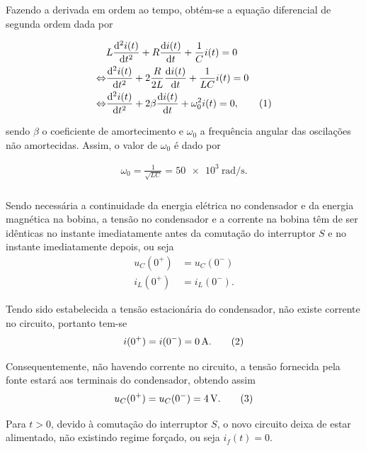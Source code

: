 \documentclass[a4paper, titlepage, portuguese]{article}
\newcommand{\eq}{\Leftrightarrow} %
\newcommand\numberthis{\addtocounter{equation}{1}\tag{\theequation}}
\begin{document}
		Fazendo a derivada em ordem ao tempo, obtém-se a equação diferencial de segunda ordem dada por

		\begin{align*}
			&L \dv[2]{i(t)}{t} + R\dv{i(t)}{t} + \frac{1}{C}i(t) = 0 \\ \eq
			&\dv[2]{i(t)}{t} + 2\frac{R}{2L}\dv{i(t)}{t} + \frac{1}{LC}i(t) = 0 \\ \eq
			&\dv[2]{i(t)}{t} + 2\beta \dv{i(t)}{t} + \omega_{0}^{2} i(t) = 0, \numberthis \label{eq_dif_2ordem}
		\end{align*}

		sendo $\beta$ o coeficiente de amortecimento e $\omega_{0}$ a frequência angular das oscilações não amortecidas. Assim, o valor de $\omega_{0}$ é dado por

		\begin{align*}
			\omega_{0} = \frac{1}{\sqrt{LC}} = \SI{50e3}{\radian\per\second}.
		\end{align*}

	\subsubsection{}

		\par
		Sendo necessária a continuidade da energia elétrica no condensador e da energia magnética na bobina, a tensão no condensador e a corrente na bobina têm de ser idênticas no instante imediatamente antes da comutação do interruptor $S$ e no instante imediatamente depois, ou seja
		\begin{align*}
			u_{C}(0^{+}) &= u_{C}(0^{-})\\
			  i_{L}(0^{+}) &= i_{L}(0^{-}).
		\end{align*}

		Tendo sido estabelecida a tensão estacionária do condensador, não existe corrente no circuito, portanto tem-se
		\begin{align*}
			i(0^{+}) = i(0^{-}) = \SI{0}{\ampere}. \numberthis \label{cond_inicial_corrente}
		\end{align*}

		Consequentemente, não havendo corrente no circuito, a tensão fornecida pela fonte estará aos terminais do condensador, obtendo assim
		\begin{align*}
			u_{C}(0^{+}) = u_{C}(0^{-}) = \SI{4}{\volt}. \numberthis \label{cond_inicial_tensão}
		\end{align*}

		Para $t > 0$, devido à comutação do interruptor $S$, o novo circuito deixa de estar alimentado, não existindo regime forçado, ou seja $i_f(t) = 0$.
\end{document}
